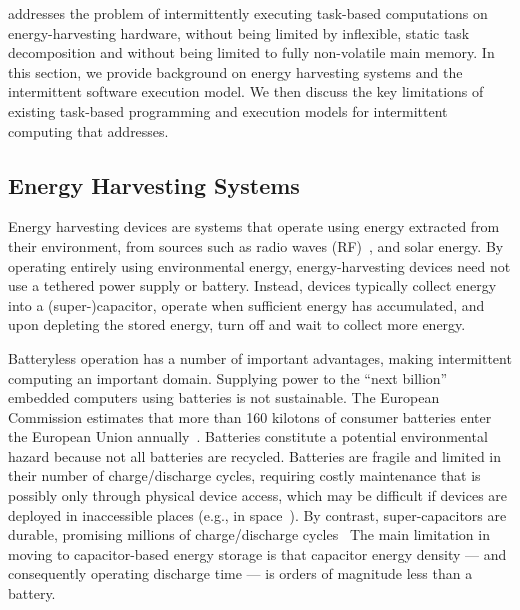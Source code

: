 \sys addresses the problem of intermittently executing task-based computations
on energy-harvesting hardware, without being limited by inflexible, static task
decomposition and without being limited to fully non-volatile main memory.  In
this section, we provide background on energy harvesting systems and the
intermittent software execution model.   We then discuss the key limitations of
existing task-based programming and execution models for intermittent computing
that \sys addresses.

\subsection{Energy Harvesting Systems}
\label{sec:background_harvesting}

Energy harvesting devices are systems that operate using energy extracted from
their environment, from sources such as radio waves (RF)~\cite{wisp}, and solar
energy.  By operating entirely using environmental energy, energy-harvesting
devices need not use a tethered power supply or battery.  Instead, devices
typically collect energy into a (super-)capacitor, operate when sufficient
energy has accumulated, and upon depleting the stored energy, turn off and wait
to collect more energy.  

Batteryless operation has a number of important advantages, making intermittent
computing an important domain.  Supplying power to the ``next
billion''~\cite{citationneeded} embedded computers using batteries is not
sustainable.  The European Commission estimates that more than 160 kilotons of
consumer batteries enter the European Union annually~\cite{eu_batteries_2016}.
Batteries constitute a potential environmental hazard because not all batteries
are recycled.  Batteries are fragile and limited in their number of
charge/discharge cycles, requiring costly maintenance that is possibly only
through physical device access, which may be difficult if devices are deployed
in inaccessible places (e.g., in space~\cite{kicksat}). By contrast,
super-capacitors are durable, promising millions of charge/discharge
cycles~\cite[Sec. I]{ongaro_pwre_2012} The main limitation in moving to
capacitor-based energy storage is that capacitor energy density --- and
consequently operating discharge time --- is orders of magnitude less than a
battery.

